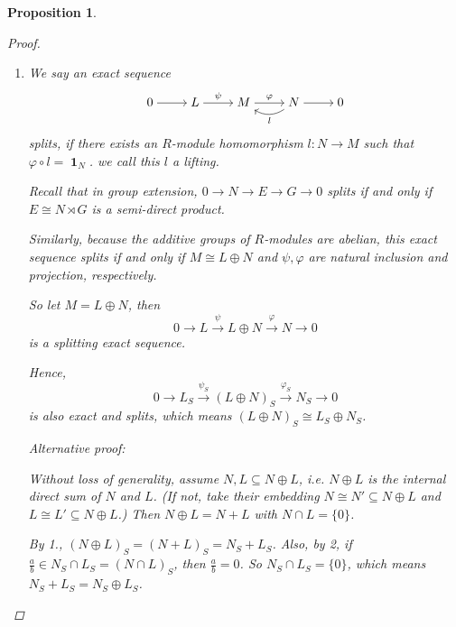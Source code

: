 \documentclass[a4paper]{article}
\DeclareMathOperator{\id}{\mathbf{1}}
\newcommand*\xto[1]{\xrightarrow{#1}}
\theoremstyle{mystyle}
\newtheorem{prop}{Proposition}
\begin{document}
\begin{prop}
\begin{proof}
\begin{enumerate}
        "$\supseteq$":
        For $x = \frac{a}{b} \in \sqrt{I_S}$, if $(\frac{a}{b})^n = 
        \frac{a^n}{b^n} = \frac{c}{d} \in I_S$, then $\exists y \in S$
        such that $yda^n = yb^nc \in I$, so $(yda)^n = y^n d^n a^n \in I$,
        i.e. $yda \in \sqrt{I}$.
        Now $x = \frac{yda}{ydb} \in (\sqrt{I})_S$.

      \item 
        We say an exact sequence
        \[
          \begin{tikzcd}[cramped]
            0 \arrow{r} & L \arrow{r}{\psi} & M \arrow{r}{\varphi} &
            N \arrow{r} \arrow[bend left=33]{l}{l} & 0
          \end{tikzcd}
        \]
        {\it splits}, if there exists an $R$-module homomorphism 
        $l: N \to M$ such that $\varphi \circ l = \id_N$.
        we call this $l$ a {\it lifting}.
        
        Recall that in group extension, $0 \to N \to E \to G \to 0$ splits 
        if and only if $E \cong N \rtimes G$ is a semi-direct product.

        Similarly, because the additive groups of $R$-modules are abelian,
        this exact sequence splits if and only if $M \cong L \oplus N$
        and $\psi, \varphi$ are natural inclusion and projection, respectively.

        So let $M = L \oplus N$, then
        \[
          0 \to L \xto{\psi} L \oplus N \xto{\varphi} N \to 0
        \]
        is a splitting exact sequence.

        Hence,
        \[
          0 \to L_S \xto{\psi_S} (L \oplus N)_S \xto{\varphi_S} N_S \to 0
        \]
        is also exact and splits, which means 
        $(L \oplus N)_S \cong L_S \oplus N_S$.

        \vspace{8pt}
        {\it Alternative proof}:

        Without loss of generality, assume $N, L \subseteq N \oplus L$, i.e. 
        $N \oplus L$ is the internal direct sum of $N$ and $L$.
        (If not, take their embedding $N \cong N' \subseteq N \oplus L$ and 
        $L \cong L' \subseteq N \oplus L$.)
        Then $N \oplus L = N + L$ with $N \cap L = \{0\}$.

        By 1., $(N \oplus L)_S = (N + L)_S = N_S + L_S$.
        Also, by 2, if $\frac{a}{b} \in N_S \cap L_S = (N \cap L)_S$,
        then $\frac{a}{b} = 0$.
        So $N_S \cap L_S = \{0\}$, which means $N_S + L_S = N_S \oplus L_S$.


\end{enumerate}
\end{proof}
\end{prop}
\end{document}
